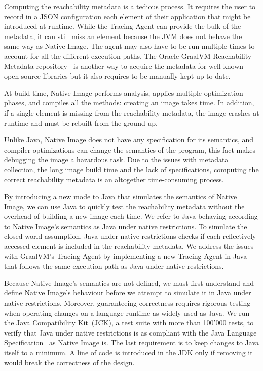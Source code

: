 Computing the reachability metadata is a tedious process. It requires the user to record in a JSON configuration each element of their application that might be introduced at runtime. While the Tracing Agent can provide the bulk of the metadata, it can still miss an element because the JVM does not behave the same way as Native Image. The agent may also have to be run multiple times to account for all the different execution paths. The Oracle GraalVM Reachability Metadata repository~\cite{noauthor_oraclegraalvm-reachability-metadata_2024} is another way to acquire the metadata for well-known open-source libraries but it also requires to be manually kept up to date.

At build time, Native Image performs analysis, applies multiple optimization phases, and compiles all the methods: creating an image takes time. In addition, if a single element is missing from the reachability metadata, the image crashes at runtime and must be rebuilt from the ground up. 

Unlike Java, Native Image does not have any specification for its semantics, and compiler optimizations can change the semantics of the program, this fact makes debugging the image a hazardous task.
Due to the issues with metadata collection, the long image build time and the lack of specifications, computing the correct reachability metadata is an altogether time-consuming process. 

By introducing a new mode to Java that simulates the semantics of Native Image, we can use Java to quickly test the reachability metadata without the overhead of building a new image each time. We refer to Java behaving according to Native Image's semantics as Java under native restrictions. To simulate the closed-world assumption, Java under native restrictions checks if each reflectively-accessed element is included in the reachability metadata. We address the issues with GraalVM's Tracing Agent by implementing a new Tracing Agent in Java that follows the same execution path as Java under native restrictions.

Because Native Image's semantics are not defined, we must first understand and define Native Image's behaviour before we attempt to simulate it in Java under native restrictions. Moreover, guaranteeing correctness requires rigorous testing when operating changes on a language runtime as widely used as Java. We run the Java Compatibility Kit~(JCK), a test suite with more than 100'000 tests, to verify that Java under native restrictions is as compliant with the Java Language Specification~\cite{noauthor_java_nodate-2} as Native Image is.
The last requirement is to keep changes to Java itself to a minimum. A line of code is introduced in the JDK only if removing it would break the correctness of the design.

